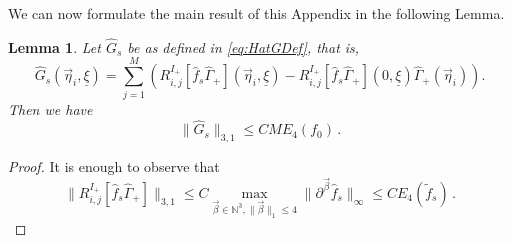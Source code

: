 \documentclass{article}
\renewcommand\v[1]{\vec{#1}}
\newcommand*\R{ \mathds{R} }
\newcommand\uv{{\underline v}}
\newcommand\uxi{{\underline \xi}}
\newcommand\vw{{\vec w}}
\newcommand\veta{{\vec \eta}}
\newtheorem{mylemma}[mythm]{Lemma}
\begin{document}

We can now formulate the main result of this Appendix in the following Lemma.

\begin{mylemma}\label{lem:Gs}
 Let $\widehat G_s$ be as defined in \eqref{eq:HatGDef}, that is,
 \begin{equation}
 \widehat G_s(\veta_i, \uxi) =
 \sum_{j = 1}^M \left(R^{I_+}_{i,j}[\hat f_{s}\widehat\Gamma_+](\veta_i, \uxi)
- R^{I_+}_{i,j}[\hat f_{s}\widehat\Gamma_+] (0,
\uxi)\widehat\Gamma_+(\veta_i)\right).
\end{equation}
Then we have
 \[
  \|\widehat G_s\|_{3,1}\leq CM E_4(f_0)\, .
 \]

\end{mylemma}

\begin{proof}
It is enough to observe that
\[
\|R^{I_+}_{i,j}[\hat f_{s}\widehat\Gamma_+]\|_{3,1}\leq C\max_{\v\beta\in\mathds N^3, \|\v\beta\|_1\leq 4}\bigl\|
\partial^{\v\beta}\hat f_s\bigr\|_\infty\leq CE_4(\tilde f_s)\, .
\]
	
\end{proof}
\end{document}

